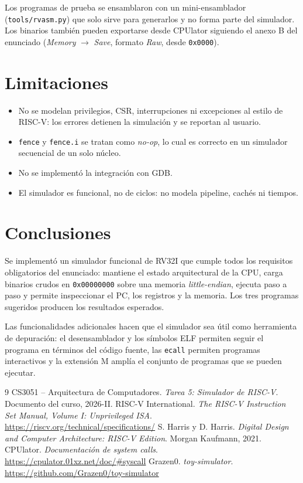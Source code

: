 \documentclass[11pt,a4paper]{article}
\begin{document}
Los programas de prueba se ensamblaron con un mini-ensamblador
(\texttt{tools/rvasm.py}) que solo sirve para generarlos y no forma parte del simulador.
Los binarios también pueden exportarse desde CPUlator siguiendo el anexo B del
enunciado (\textit{Memory} $\rightarrow$ \textit{Save}, formato \textit{Raw}, desde
\texttt{0x0000}).

\section{Limitaciones}

\begin{itemize}
  \item No se modelan privilegios, CSR, interrupciones ni excepciones al estilo de
    RISC-V: los errores detienen la simulación y se reportan al usuario.
  \item \texttt{fence} y \texttt{fence.i} se tratan como \textit{no-op}, lo cual es
    correcto en un simulador secuencial de un solo núcleo.
  \item No se implementó la integración con GDB.
  \item El simulador es funcional, no de ciclos: no modela pipeline, cachés ni tiempos.
\end{itemize}

\section{Conclusiones}

Se implementó un simulador funcional de RV32I que cumple todos los requisitos
obligatorios del enunciado: mantiene el estado arquitectural de la CPU, carga binarios
crudos en \texttt{0x00000000} sobre una memoria \textit{little-endian}, ejecuta paso a
paso y permite inspeccionar el PC, los registros y la memoria. Los tres programas
sugeridos producen los resultados esperados.

Las funcionalidades adicionales hacen que el simulador sea útil como herramienta de
depuración: el desensamblador y los símbolos ELF permiten seguir el programa en
términos del código fuente, las \texttt{ecall} permiten programas interactivos y la
extensión M amplía el conjunto de programas que se pueden ejecutar.

\begin{thebibliography}{9}
   CS3051 -- Arquitectura de Computadores. \textit{Tarea 5: Simulador de
    RISC-V}. Documento del curso, 2026-II.
   RISC-V International. \textit{The RISC-V Instruction Set Manual,
    Volume I: Unprivileged ISA}. \url{https://riscv.org/technical/specifications/}
   S. Harris y D. Harris. \textit{Digital Design and Computer
    Architecture: RISC-V Edition}. Morgan Kaufmann, 2021.
   CPUlator. \textit{Documentación de system calls}.
    \url{https://cpulator.01xz.net/doc/#syscall}
   Grazen0. \textit{toy-simulator}.
    \url{https://github.com/Grazen0/toy-simulator}
\end{thebibliography}
\end{document}
